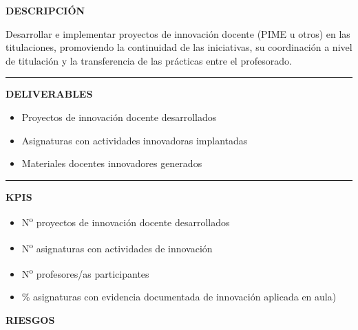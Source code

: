 \documentclass[11pt,a4paper]{scrreprt}
\newcommand{\fieldlabel}[1]{%
  {\footnotesize\sffamily\bfseries\color{mutedcolor}\MakeUppercase{#1}}\par\nopagebreak[4]
}
\newcommand{\fieldsep}{\vspace{3pt}\noindent\textcolor{bordercolor}{\rule{\linewidth}{0.4pt}}\vspace{3pt}\par}
\begin{document}
\begin{tcolorbox}[pabox={aacolor}{PA4.1 \enspace\textbullet\enspace Desarrollo y aplicación de proyectos de innovación docente}]

\fieldlabel{Descripci\'on}
{\small Desarrollar e implementar proyectos de innovación docente (PIME u otros) en las titulaciones, promoviendo la continuidad de las iniciativas, su coordinación a nivel de titulación y la transferencia de las prácticas entre el profesorado.}\par
\fieldsep
\fieldlabel{Deliverables}
{\small \begin{itemize}[noitemsep,topsep=2pt]
\item Proyectos de innovación docente desarrollados
\item Asignaturas con actividades innovadoras implantadas
\item Materiales docentes innovadores generados

\end{itemize}}\par
\fieldsep
\fieldlabel{KPIs}
{\small \begin{itemize}[noitemsep,topsep=2pt]
\item N\textsuperscript{o} proyectos de innovación docente desarrollados
\item N\textsuperscript{o} asignaturas con actividades de innovación
\item N\textsuperscript{o} profesores/as participantes
\item \% asignaturas con evidencia documentada de innovación aplicada en aula)
\end{itemize}}\par
\end{tcolorbox}
\begin{tcolorbox}[riskbox]
{\footnotesize\sffamily\bfseries\color{red!50!black} RIESGOS}\par{}
\end{tcolorbox}
\end{document}
